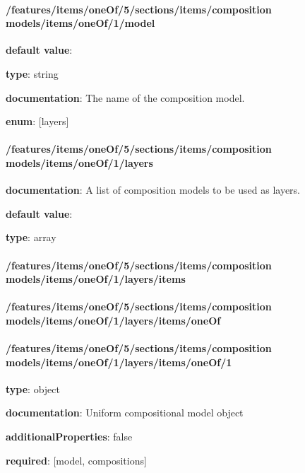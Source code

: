 \paragraph{/features/items/oneOf/5/sections/items/composition models/items/oneOf/1/model} \begin{itemized}
\item {\bf default value}: 
\item {\bf type}: string
\item {\bf documentation}: The name of the composition model.
\item {\bf enum}: [layers]\end{itemized}\paragraph{/features/items/oneOf/5/sections/items/composition models/items/oneOf/1/layers} \begin{itemized}
\item {\bf documentation}: A list of composition models to be used as layers.
\item {\bf default value}: 
\item {\bf type}: array
\paragraph{/features/items/oneOf/5/sections/items/composition models/items/oneOf/1/layers/items} \begin{itemized}
\end{itemized}\end{itemized}\paragraph{/features/items/oneOf/5/sections/items/composition models/items/oneOf/1/layers/items/oneOf} \begin{itemized}
\end{itemized}\paragraph{/features/items/oneOf/5/sections/items/composition models/items/oneOf/1/layers/items/oneOf/1} \begin{itemized}
\item {\bf type}: object
\item {\bf documentation}: Uniform compositional model object
\item {\bf additionalProperties}: false
\item {\bf required}: [model, compositions]\end{itemized}
